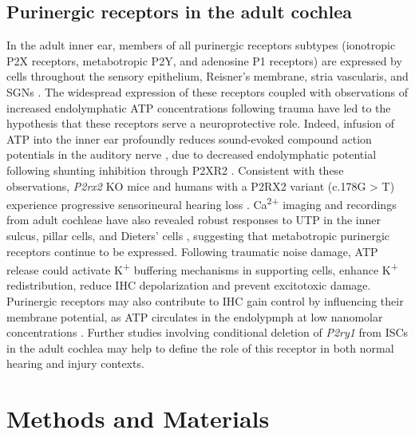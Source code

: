 \documentclass[9pt,lineno]{elife}
\begin{document}
\subsection{Purinergic receptors in the adult cochlea}
In the adult inner ear, members of all purinergic receptors subtypes (ionotropic P2X receptors, metabotropic P2Y, and adenosine P1 receptors) are expressed by cells throughout the sensory epithelium, Reisner’s membrane, stria vascularis, and SGNs \citep{Housley2009a,Huang2010}. The widespread expression of these receptors coupled with observations of increased endolymphatic ATP concentrations following trauma \citep{Munoz1995} have led to the hypothesis that these receptors serve a neuroprotective role. Indeed, infusion of ATP into the inner ear profoundly reduces sound-evoked compound action potentials in the auditory nerve \citep{Bobbin1978a,Munoz1995b}, due to decreased endolymphatic potential following shunting inhibition through P2XR2 \citep{Housley2013b}. Consistent with these observations, \textit{P2rx2} KO mice and humans with a P2RX2 variant (c.178G > T) experience progressive sensorineural hearing loss \citep{Yan2013a}. Ca\textsuperscript{2+} imaging and recordings from adult cochleae have also revealed robust responses to UTP in the inner sulcus, pillar cells, and Dieters' cells \citep{Sirko2019,Zhu2010a}, suggesting that metabotropic purinergic receptors continue to be expressed. Following traumatic noise damage, ATP release could activate K\textsuperscript{+} buffering mechanisms in supporting cells, enhance K\textsuperscript{+} redistribution, reduce IHC depolarization and prevent excitotoxic damage. Purinergic receptors may also contribute to IHC gain control by influencing their membrane potential, as ATP circulates in the endolypmph at low nanomolar concentrations \citep{Munoz1995}. Further studies involving conditional deletion of \textit{P2ry1} from ISCs in the adult cochlea may help to define the role of this receptor in both normal hearing and injury contexts.


\section{Methods and Materials}
\end{document}
